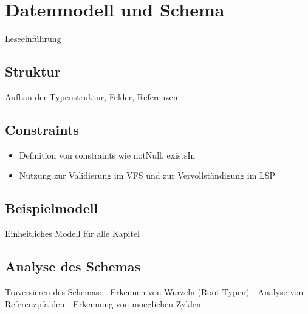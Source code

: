 \section{Datenmodell und Schema}
Leseeinführung 

\subsection{Struktur}
Aufbau der Typenstruktur, Felder, Referenzen.

\subsection{Constraints}

\begin{itemize}
	\item Definition von constraints wie notNull, existsIn
	\item Nutzung zur Validierung im VFS und zur Vervollständigung im LSP
\end{itemize}

\subsection{Beispielmodell}
Einheitliches Modell für alle Kapitel

\subsection{Analyse des Schemas}
Traversieren des Schemas: - Erkennen von Wurzeln (Root-Typen) - Analyse von Referenzpfa 
den - Erkennung von moeglichen Zyklen


